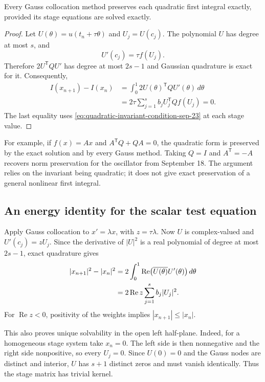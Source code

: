 \begin{theorem}
 Every Gauss collocation method preserves each quadratic first
 integral exactly, provided its stage equations are solved exactly.
\end{theorem}

\begin{proof}
 Let \(U(\theta)=u(t_n+\tau\theta)\) and \(U_j=U(c_j)\).
 The polynomial \(U\) has degree at most \(s\), and
 \[
  U'(c_j)=\tau f(U_j).
 \]
 Therefore \(2U^{\mathsf T}QU'\) has degree at most \(2s-1\)
 and Gaussian quadrature is exact for it. Consequently,
 \begin{align*}
  I(x_{n+1})-I(x_n)
   &=\int_0^1 2U(\theta)^{\mathsf T}QU'(\theta)\,d\theta\\
   &=2\tau\sum_{j=1}^s b_j U_j^{\mathsf T}Qf(U_j)=0.
 \end{align*}
 The last equality uses \eqref{eq:quadratic-invariant-condition-sep-23}
 at each stage value.
\end{proof}

For example, if \(f(x)=Ax\) and \(A^{\mathsf T}Q+QA=0\), the
quadratic form is preserved by the exact solution and by every Gauss
method. Taking \(Q=I\) and \(A^{\mathsf T}=-A\) recovers norm
preservation for the oscillator from September 18.
The argument relies on the invariant being quadratic; it does not
give exact preservation of a general nonlinear first integral.

\subsection{An energy identity for the scalar test equation}

Apply Gauss collocation to \(x'=\lambda x\), with
\(z=\tau\lambda\). Now \(U\) is complex-valued and
\(U'(c_j)=zU_j\). Since the derivative of \(|U|^2\) is a real
polynomial of degree at most \(2s-1\), exact quadrature gives
\begin{align}
 |x_{n+1}|^2-|x_n|^2
  &=2\int_0^1\operatorname{Re}
       \bigl(\overline{U(\theta)}U'(\theta)\bigr)\,d\theta\notag\\
  &=2\operatorname{Re}z\sum_{j=1}^s b_j|U_j|^2.
       \label{eq:gauss-energy-identity-sep-23}
\end{align}
For \(\operatorname{Re}z<0\), positivity of the weights implies
\(|x_{n+1}|\leq|x_n|\).

This also proves unique solvability in the open left half-plane.
Indeed, for a homogeneous stage system take \(x_n=0\). The left
side is then nonnegative and the right side nonpositive, so every
\(U_j=0\). Since \(U(0)=0\) and the Gauss nodes are distinct and
interior, \(U\) has \(s+1\) distinct zeros and must vanish
identically. Thus the stage matrix has trivial kernel.

